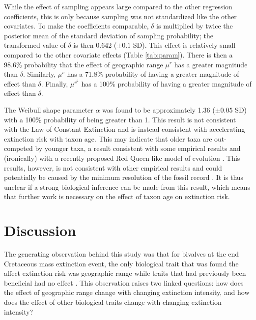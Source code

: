 \documentclass{article}
\begin{document}
While the effect of sampling appears large compared to the other regression coefficients, this is only because sampling was not standardized like the other covariates. To make the coefficients comparable, \(\delta\) is multiplied by twice the posterior mean of the standard deviation of sampling probability; the transformed value of \(\delta\) is then 0.642 (\(\pm 0.1\) SD). This effect is relatively small compared to the other covariate effects (Table \ref{tab:param}). There is then a 98.6\% probability that the effect of geographic range \(\mu^{r}\) has a greater magnitude than \(\delta\). Similarly, \(\mu^{v}\) has a 71.8\% probability of having a greater magnitude of effect than \(\delta\). Finally, \(\mu^{v^{2}}\) has a 100\% probability of having a greater magnitude of effect than \(\delta\).

The Weibull shape parameter \(\alpha\) was found to be approximately 1.36 (\(\pm 0.05\) SD) with a 100\% probability of being greater than 1. This result is not consistent with the Law of Constant Extinction \citep{VanValen1973} and is instead consistent with accelerating extinction risk with taxon age. This may indicate that older taxa are out-competed by younger taxa, a result consistent with some empirical results \citep{Wagner2014b,Quental2013,Smits2015} and (ironically) with a recently proposed Red Queen-like model of evolution \citep{Rosindell2015a}. This results, however, is not consistent with other empirical results \citep{Finnegan2008,Crampton2016} and could potentially be caused by the minimum resolution of the fossil record \citep{Sepkoski1975}. It is thus unclear if a strong biological inference can be made from this result, which means that further work is necessary on the effect of taxon age on extinction risk.


\section{Discussion}

The generating observation behind this study was that for bivalves at the end Cretaceous mass extinction event, the only biological trait that was found the affect extinction risk was geographic range while traits that had previously been beneficial had no effect \citep{Jablonski1986}. This observation raises two linked questions: how does the effect of geographic range change with changing extinction intensity, and how does the effect of other biological traits change with changing extinction intensity?
\end{document}
